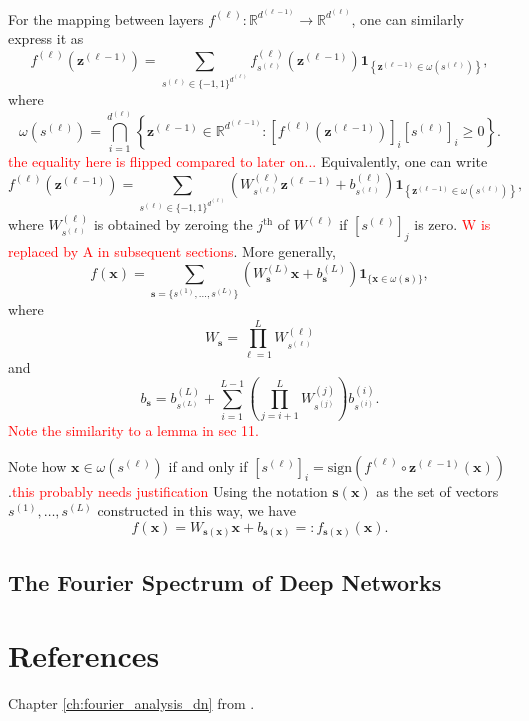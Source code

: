 \begin{remark}
    For the mapping between layers $f^{(\ell)}:\mathbb{R}^{d^{(\ell-1)}}\to\mathbb{R}^{d^{(\ell)}}$, one can similarly express it as $$f^{(\ell)}\left(\mathbf{z}^{(\ell-1)}\right)=\sum_{s^{(\ell)}\in\{-1,1\}^{d^{(\ell)}}}f^{(\ell)}_{s^{(\ell)}}\left(\mathbf{z}^{(\ell-1)}\right)\mathbf{1}_{\left\{\mathbf{z}^{(\ell-1)}\in\omega\left(s^{(\ell)}\right)\right\}},$$where $$\omega\left(s^{(\ell)}\right)=\bigcap_{i=1}^{d^{(\ell)}}\left\{\mathbf{z}^{(\ell-1)}\in\mathbb{R}^{d^{(\ell-1)}}:\left[f^{(\ell)}\left(\mathbf{z}^{(\ell-1)}\right)\right]_i\left[s^{(\ell)}\right]_i\geq0\right\}.$$
    \textcolor{Red}{the equality here is flipped compared to later on...} Equivalently, one can write $$f^{(\ell)}\left(\mathbf{z}^{(\ell-1)}\right)=\sum_{s^{(\ell)}\in\{-1,1\}^{d^{(\ell)}}}\left(W^{(\ell)}_{s^{(\ell)}}\mathbf{z}^{(\ell-1)}+b^{(\ell)}_{s^{(\ell)}}\right)\mathbf{1}_{\left\{\mathbf{z}^{(\ell-1)}\in\omega\left(s^{(\ell)}\right)\right\}},$$where $W^{(\ell)}_{s^{(\ell)}}$ is obtained by zeroing the $j^{\text{th}}$ of $W^{(\ell)}$ if $\left[s^{(\ell)}\right]_j$ is zero. \textcolor{Red}{W is replaced by A in subsequent sections}. More generally, $$f(\mathbf{x})=\sum_{\mathbf{s}=\{s^{(1)},\dots,s^{(L)}\}}\left(W_{\mathbf{s}}^{(L)}\mathbf{x}+b_{\mathbf{s}}^{(L)}\right)\mathbf{1}_{\{\mathbf{x}\in\omega(\mathbf{s})\}},$$where $$W_{\mathbf{s}}=\prod_{\ell=1}^LW_{s^{(\ell)}}^{(\ell)}$$and$$b_{\mathbf{s}}=b^{(L)}_{s^{(L)}}+\sum_{i=1}^{L-1}\left(\prod_{j=i+1}^{L}W^{(j)}_{s^{(j)}}\right)b^{(i)}_{s^{(i)}}.$$
    \textcolor{Red}{Note the similarity to a lemma in sec 11.}
\end{remark}

Note how $\mathbf{x}\in\omega\left(s^{(\ell)}\right)$ if and only if $\left[s^{(\ell)}\right]_i=\mathrm{sign}\left(f^{(\ell)}\circ\mathbf{z}^{(\ell-1)}(\mathbf{x})\right)$.\textcolor{Red}{this probably needs justification} Using the notation $\mathbf{s}(\mathbf{x})$ as the set of vectors $s^{(1)},\dots,s^{(L)}$ constructed in this way, we have $$f(\mathbf{x})=W_{\mathbf{s}(\mathbf{x})}\mathbf{x}+b_{\mathbf{s}(\mathbf{x})}=:f_{\mathbf{s}(\mathbf{x})}(\mathbf{x}).$$

\subsection{The Fourier Spectrum of Deep Networks}



\section{References}

Chapter \ref{ch:fourier_analysis_dn} from \citet{rahamanSpectralBiasNeural2018}.
